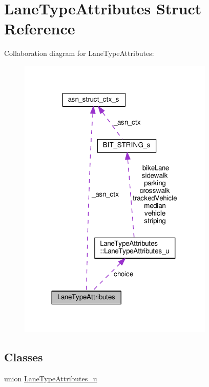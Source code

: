 \hypertarget{structLaneTypeAttributes}{}\section{Lane\+Type\+Attributes Struct Reference}
\label{structLaneTypeAttributes}


Collaboration diagram for Lane\+Type\+Attributes\+:\nopagebreak
\begin{figure}[H]
\begin{center}
\leavevmode
\includegraphics[width=264pt]{structLaneTypeAttributes__coll__graph}
\end{center}
\end{figure}
\subsection*{Classes}
\begin{DoxyCompactItemize}
\item 
union \hyperlink{unionLaneTypeAttributes_1_1LaneTypeAttributes__u}{Lane\+Type\+Attributes\+\_\+u}
\end{DoxyCompactItemize}
